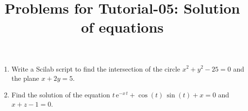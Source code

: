 \documentclass[10pt,a4paper]{article}
\begin{document}
\title{Problems for Tutorial-05: Solution of equations}
\date{}
\maketitle
\begin{enumerate}
\item Write a Scilab script to find the intersection of the circle 
$x^2 + y^2 - 25 = 0$ and the plane $x + 2y = 5$.
\item Find the solution of the equation $t \, \mathrm{e}^{-x \,t} + \cos(t) \, \sin(t) + x = 0$ and $x+z-1 = 0$.
\end{enumerate}
\end{document}
